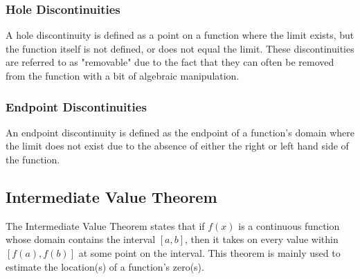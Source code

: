 \documentclass[11pt]{article}
\begin{document}
\subsubsection*{Hole Discontinuities}
A hole discontinuity is defined as a point on a function where the limit exists, but the function itself is not defined, or does not equal the limit. These discontinuities are referred to as "removable" due to the fact that they can often be removed from the function with a bit of algebraic manipulation.

\begin{center}
\end{center}

\subsubsection*{Endpoint Discontinuities}
An endpoint discontinuity is defined as the endpoint of a function's domain where the limit does not exist due to the absence of either the right or left hand side of the function. 

\begin{center}
\end{center}

\subsection{Intermediate Value Theorem}
The Intermediate Value Theorem states that if $f(x)$ is a continuous function whose domain contains the interval $[a, b]$, then it takes on every value within $[f(a), f(b)]$ at some point on the interval. This theorem is mainly used to estimate the location(s) of a function's zero(s).
\end{document}
